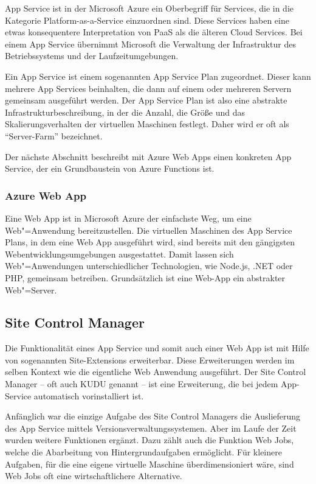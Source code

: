 App Service ist in der Microsoft Azure ein Oberbegriff für Services, die in die Kategorie Platform-as-a-Service einzuordnen sind. Diese Services haben eine etwas konsequentere Interpretation von PaaS als die älteren Cloud Services. Bei einem App Service übernimmt Microsoft die Verwaltung der Infrastruktur des Betriebssystems und der Laufzeitumgebungen. 

Ein App Service ist einem sogenannten App Service Plan zugeordnet. Dieser kann mehrere App Services beinhalten, die dann auf einem oder mehreren Servern gemeinsam ausgeführt werden. Der App Service Plan ist also eine abstrakte Infrastrukturbeschreibung, in der die Anzahl, die Größe und das Skalierungsverhalten der virtuellen Maschinen festlegt. Daher wird er oft als "`Server-Farm"' bezeichnet.

Der nächste Abschnitt beschreibt mit Azure Web Apps einen konkreten App Service, der ein Grundbaustein von Azure Functions ist.

\subsubsection{Azure Web App}

Eine Web App ist in Microsoft Azure der einfachste Weg, um eine Web"=Anwendung bereitzustellen. Die virtuellen Maschinen des App Service Plans, in dem eine Web App ausgeführt wird, sind bereits mit den gängigsten Webentwicklungsumgebungen ausgestattet. Damit lassen sich Web"=Anwendungen unterschiedlicher Technologien, wie \zB Node.js, .NET oder PHP, gemeinsam betreiben. Grundsätzlich ist eine Web-App ein abstrakter Web"=Server.

\subsection{Site Control Manager}

Die Funktionalität eines App Service und somit auch einer Web App ist mit Hilfe von sogenannten Site-Extensions erweiterbar. Diese Erweiterungen werden im selben Kontext wie die eigentliche Web Anwendung ausgeführt. Der Site Control Manager -- oft auch KUDU genannt -- ist eine Erweiterung, die bei jedem App-Service automatisch vorinstalliert ist.

Anfänglich war die einzige Aufgabe des Site Control Managers die Auslieferung des App Service mittels Versionsverwaltungssystemen. Aber im Laufe der Zeit wurden weitere Funktionen ergänzt. Dazu zählt auch die Funktion Web Jobs, welche die Abarbeitung von Hintergrundaufgaben ermöglicht. Für kleinere Aufgaben, für die eine eigene virtuelle Maschine überdimensioniert wäre, sind Web Jobs oft eine wirtschaftlichere Alternative.

